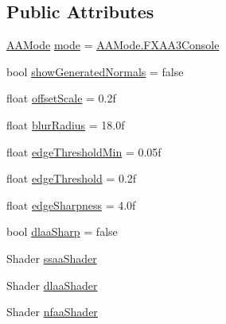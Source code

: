 \subsection*{Public Attributes}
\begin{DoxyCompactItemize}
\item 
\mbox{\hyperlink{namespace_unity_standard_assets_1_1_image_effects_a158625add19c62e52c685a8700b4cd99}{A\+A\+Mode}} \mbox{\hyperlink{class_unity_standard_assets_1_1_image_effects_1_1_antialiasing_a491ce7a0d9de2825cc47f85b7aa832f8}{mode}} = \mbox{\hyperlink{namespace_unity_standard_assets_1_1_image_effects_a158625add19c62e52c685a8700b4cd99ae335206741330e3acd43b65f014905a3}{A\+A\+Mode.\+F\+X\+A\+A3\+Console}}
\item 
bool \mbox{\hyperlink{class_unity_standard_assets_1_1_image_effects_1_1_antialiasing_ae0cfc0cdaa93373426148c7ea1e8fd76}{show\+Generated\+Normals}} = false
\item 
float \mbox{\hyperlink{class_unity_standard_assets_1_1_image_effects_1_1_antialiasing_a0f44d1dbe249f3ef2057847e4835e69d}{offset\+Scale}} = 0.\+2f
\item 
float \mbox{\hyperlink{class_unity_standard_assets_1_1_image_effects_1_1_antialiasing_ae725653ed0504df249120c0b5e6b699c}{blur\+Radius}} = 18.\+0f
\item 
float \mbox{\hyperlink{class_unity_standard_assets_1_1_image_effects_1_1_antialiasing_a723f5b6f295f4607e3a9a47a78121786}{edge\+Threshold\+Min}} = 0.\+05f
\item 
float \mbox{\hyperlink{class_unity_standard_assets_1_1_image_effects_1_1_antialiasing_aba719d893e6d094a1ec7abdf1f5405f4}{edge\+Threshold}} = 0.\+2f
\item 
float \mbox{\hyperlink{class_unity_standard_assets_1_1_image_effects_1_1_antialiasing_a230cea823e496e199088d67ce2821c97}{edge\+Sharpness}} = 4.\+0f
\item 
bool \mbox{\hyperlink{class_unity_standard_assets_1_1_image_effects_1_1_antialiasing_a634e903db2c93e848d115bbaf49be6c7}{dlaa\+Sharp}} = false
\item 
Shader \mbox{\hyperlink{class_unity_standard_assets_1_1_image_effects_1_1_antialiasing_ac0b8e97f36d170cd2555aac23943b506}{ssaa\+Shader}}
\item 
Shader \mbox{\hyperlink{class_unity_standard_assets_1_1_image_effects_1_1_antialiasing_a8291968941d29540fe6622042b8dadf7}{dlaa\+Shader}}
\item 
Shader \mbox{\hyperlink{class_unity_standard_assets_1_1_image_effects_1_1_antialiasing_a69e2e880ea08a6142903d5550077e5ab}{nfaa\+Shader}}

\end{DoxyCompactItemize}
